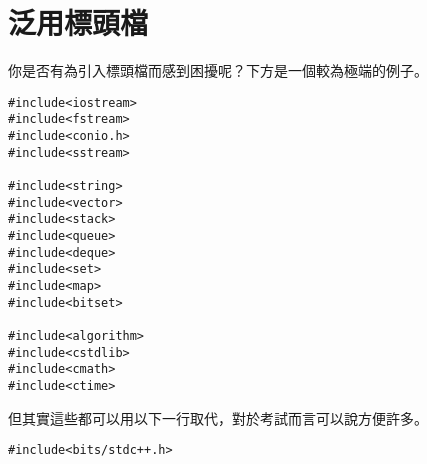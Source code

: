 \section{泛用標頭檔}
    你是否有為引入標頭檔而感到困擾呢？下方是一個較為極端的例子。

    \begin{lstlisting}
#include<iostream>
#include<fstream>
#include<conio.h>
#include<sstream>

#include<string>
#include<vector>
#include<stack>
#include<queue>
#include<deque>
#include<set>
#include<map>
#include<bitset>

#include<algorithm>
#include<cstdlib>
#include<cmath>
#include<ctime>\end{lstlisting}

    但其實這些都可以用以下一行取代，對於考試而言可以說方便許多。

    \begin{lstlisting}[caption=泛用標頭檔]
#include<bits/stdc++.h>\end{lstlisting}

